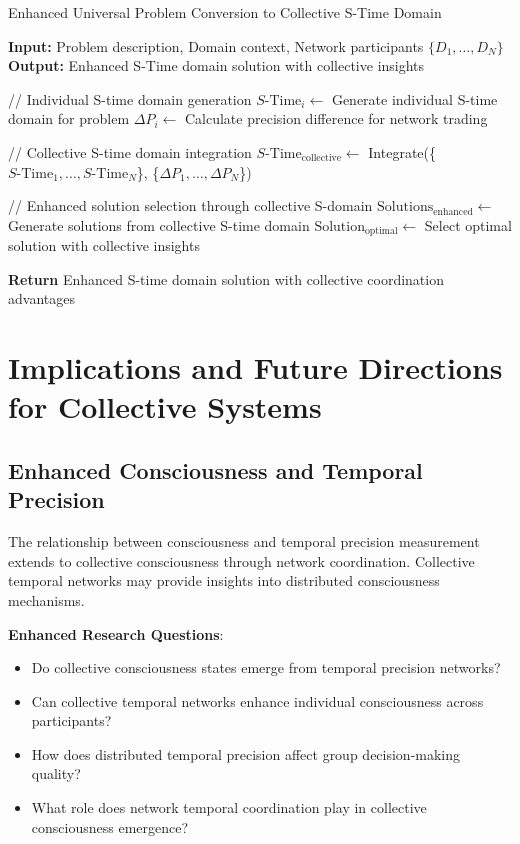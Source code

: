 \documentclass[12pt,a4paper]{article}
\begin{document}
\begin{algorithm}
\caption{Enhanced Universal Problem Conversion to Collective S-Time Domain}
\begin{algorithmic}
\State \textbf{Input:} Problem description, Domain context, Network participants $\{D_1, \ldots, D_N\}$
\State \textbf{Output:} Enhanced S-Time domain solution with collective insights

\State // Individual S-time domain generation
    \State $S\text{-Time}_i \leftarrow$ Generate individual S-time domain for problem
    \State $\Delta P_i \leftarrow$ Calculate precision difference for network trading
\EndFor

\State // Collective S-time domain integration
\State $S\text{-Time}_{\text{collective}} \leftarrow$ Integrate(\{$S\text{-Time}_1, \ldots, S\text{-Time}_N$\}, \{$\Delta P_1, \ldots, \Delta P_N$\})

\State // Enhanced solution selection through collective S-domain
\State $\text{Solutions}_{\text{enhanced}} \leftarrow$ Generate solutions from collective S-time domain
\State $\text{Solution}_{\text{optimal}} \leftarrow$ Select optimal solution with collective insights

\State \textbf{Return} Enhanced S-time domain solution with collective coordination advantages
\end{algorithmic}
\end{algorithm}

\section{Implications and Future Directions for Collective Systems}

\subsection{Enhanced Consciousness and Temporal Precision}

The relationship between consciousness and temporal precision measurement extends to collective consciousness through network coordination. Collective temporal networks may provide insights into distributed consciousness mechanisms.

\textbf{Enhanced Research Questions}:
\begin{itemize}
\item Do collective consciousness states emerge from temporal precision networks?
\item Can collective temporal networks enhance individual consciousness across participants?
\item How does distributed temporal precision affect group decision-making quality?
\item What role does network temporal coordination play in collective consciousness emergence?
\end{itemize}
\end{document}
